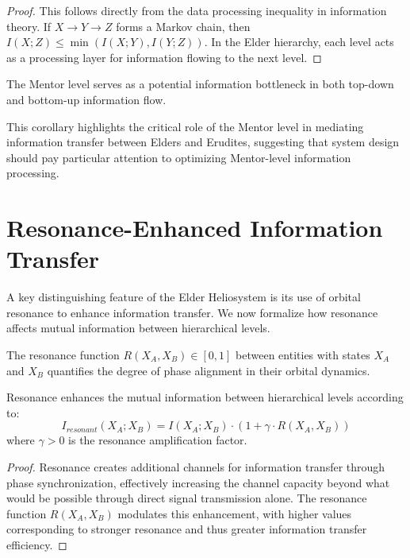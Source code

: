 \begin{proof}
This follows directly from the data processing inequality in information theory. If $X \rightarrow Y \rightarrow Z$ forms a Markov chain, then $I(X; Z) \leq \min(I(X; Y), I(Y; Z))$. In the Elder hierarchy, each level acts as a processing layer for information flowing to the next level.
\end{proof}

\begin{corollary}
The Mentor level serves as a potential information bottleneck in both top-down and bottom-up information flow.
\end{corollary}

This corollary highlights the critical role of the Mentor level in mediating information transfer between Elders and Erudites, suggesting that system design should pay particular attention to optimizing Mentor-level information processing.

\section{Resonance-Enhanced Information Transfer}



A key distinguishing feature of the Elder Heliosystem is its use of orbital resonance to enhance information transfer. We now formalize how resonance affects mutual information between hierarchical levels.

\begin{definition}
The resonance function $R(X_A, X_B) \in [0, 1]$ between entities with states $X_A$ and $X_B$ quantifies the degree of phase alignment in their orbital dynamics.
\end{definition}

\begin{theorem}
Resonance enhances the mutual information between hierarchical levels according to:
\begin{equation}
I_{resonant}(X_A; X_B) = I(X_A; X_B) \cdot (1 + \gamma \cdot R(X_A, X_B))
\end{equation}
where $\gamma > 0$ is the resonance amplification factor.
\end{theorem}

\begin{proof}
Resonance creates additional channels for information transfer through phase synchronization, effectively increasing the channel capacity beyond what would be possible through direct signal transmission alone. The resonance function $R(X_A, X_B)$ modulates this enhancement, with higher values corresponding to stronger resonance and thus greater information transfer efficiency.
\end{proof}

